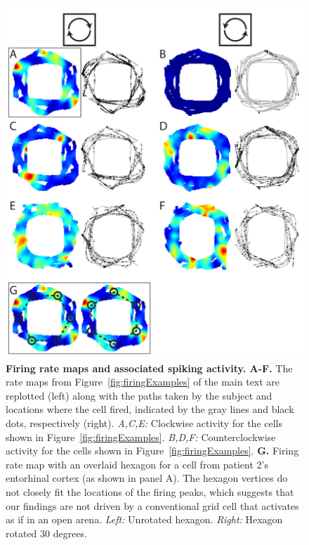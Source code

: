 \begin{figure}[bh]
\centering
\includegraphics[width=.95\textwidth]{./tex/linearGrids/figs/supp_with_dots.pdf}
\caption[Firing rate maps and associated spiking activity]{\textbf{Firing rate maps and associated spiking activity. A-F. } The rate maps from Figure~\ref{fig:firingExamples} of the main text are replotted (left) along with the paths taken by the subject and locations where the cell fired, indicated by the gray lines and black dots, respectively (right). \emph{A,C,E:} Clockwise activity for the cells shown in Figure~\ref{fig:firingExamples}. \emph{B,D,F:} Counterclockwise activity for the cells shown in Figure~\ref{fig:firingExamples}. \textbf{G. } Firing rate map with an overlaid hexagon for a cell from patient 2's entorhinal cortex (as shown in panel A). The hexagon vertices do not closely fit the locations of the firing peaks, which suggests that our findings are not driven by a conventional grid cell that activates as if in an open arena. \emph{Left:} Unrotated hexagon. \emph{Right:} Hexagon rotated 30 degrees.}
\label{fig:subDots}
\end{figure}

